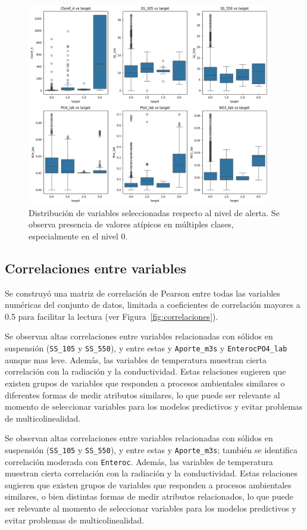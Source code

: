 \documentclass[11pt]{report}
\begin{document}
\begin{figure}[H]
    \centering
    \includegraphics[width=0.95\textwidth]{Imagenes/Boxplots_Target_3x2.png}
    \caption{Distribución de variables seleccionadas respecto al nivel de alerta. Se observa presencia de valores atípicos en múltiples clases, especialmente en el nivel 0.}
    \label{fig:outliers-boxplots}
\end{figure}

\subsection{Correlaciones entre variables}

Se construyó una matriz de correlación de Pearson entre todas las variables numéricas del conjunto de datos, limitada a coeficientes de correlación mayores a 0.5 para facilitar la lectura (ver Figura~\ref{fig:correlaciones}).

Se observan altas correlaciones entre variables relacionadas con sólidos en suspensión (\texttt{SS\_105} y \texttt{SS\_550}), y entre estas y \texttt{Aporte\_m3s} y \texttt{EnterocPO4\_lab} aunque mas leve. Además, las variables de temperatura muestran cierta correlación con la radiación y la conductividad. Estas relaciones sugieren que existen grupos de variables que responden a procesos ambientales similares o diferentes formas de medir atributos similares, lo que puede ser relevante al momento de seleccionar variables para los modelos predictivos y evitar problemas de multicolinealidad.

Se observan altas correlaciones entre variables relacionadas con sólidos en suspensión (\texttt{SS\_105} y \texttt{SS\_550}), y entre estas y \texttt{Aporte\_m3s}; también se identifica correlación moderada con \texttt{Enteroc}. Además, las variables de temperatura muestran cierta correlación con la radiación y la conductividad. Estas relaciones sugieren que existen grupos de variables que responden a procesos ambientales similares, o bien distintas formas de medir atributos relacionados, lo que puede ser relevante al momento de seleccionar variables para los modelos predictivos y evitar problemas de multicolinealidad.
\end{document}
